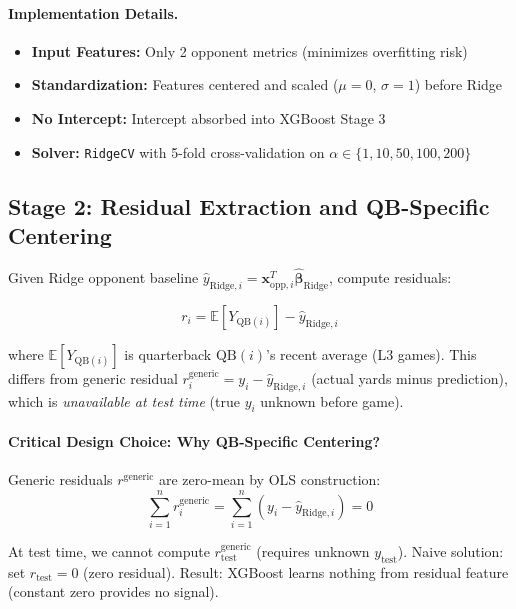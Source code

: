 \paragraph{Implementation Details.}
\begin{itemize}[itemsep=2pt,parsep=0pt]
    \item \textbf{Input Features:} Only 2 opponent metrics (minimizes overfitting risk)
    \item \textbf{Standardization:} Features centered and scaled ($\mu = 0$, $\sigma = 1$) before Ridge
    \item \textbf{No Intercept:} Intercept absorbed into XGBoost Stage 3
    \item \textbf{Solver:} \texttt{RidgeCV} with 5-fold cross-validation on $\alpha \in \{1, 10, 50, 100, 200\}$
\end{itemize}

\subsection{Stage 2: Residual Extraction and QB-Specific Centering}

Given Ridge opponent baseline $\hat{y}_{\text{Ridge}, i} = \mathbf{x}_{\text{opp}, i}^T \hat{\boldsymbol{\beta}}_{\text{Ridge}}$, compute residuals:

\begin{equation}
r_i = \mathbb{E}[Y_{\text{QB}(i)}] - \hat{y}_{\text{Ridge}, i}
\label{eq:qb-specific-residual}
\end{equation}

where $\mathbb{E}[Y_{\text{QB}(i)}]$ is quarterback $\text{QB}(i)$'s recent average (L3 games). This differs from generic residual $r_i^{\text{generic}} = y_i - \hat{y}_{\text{Ridge}, i}$ (actual yards minus prediction), which is \emph{unavailable at test time} (true $y_i$ unknown before game).

\paragraph{Critical Design Choice: Why QB-Specific Centering?}
Generic residuals $r^{\text{generic}}$ are zero-mean by OLS construction:
\begin{equation}
\sum_{i=1}^{n} r_i^{\text{generic}} = \sum_{i=1}^{n} (y_i - \hat{y}_{\text{Ridge}, i}) = 0
\end{equation}

At test time, we cannot compute $r_{\text{test}}^{\text{generic}}$ (requires unknown $y_{\text{test}}$). Naive solution: set $r_{\text{test}} = 0$ (zero residual). Result: XGBoost learns nothing from residual feature (constant zero provides no signal).

